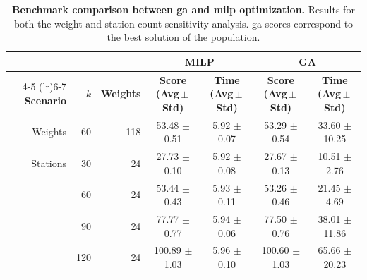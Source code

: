         \begin{table}[!htbp]
        \centering
        \caption[Benchmark comparison between GA and MILP optimization]{
            \textbf{Benchmark comparison between \ac{ga} and \ac{milp} optimization.} 
            Results for both the weight and station count sensitivity analysis. \ac{ga} scores correspond to the best solution of the population.}
        \label{table:MILP_combined}
        \footnotesize
        \begin{tabular}{r r r cc cc}
        \toprule
        & & & \multicolumn{2}{c}{\textbf{MILP}} & \multicolumn{2}{c}{\textbf{GA}} \\
        \cmidrule(lr){4-5} \cmidrule(lr){6-7}
        \textbf{Scenario} & \textbf{\(k\)} & \textbf{Weights} 
            & \textbf{Score (Avg\,$\pm$\,Std)} & \textbf{Time (Avg\,$\pm$\,Std)} 
            & \textbf{Score (Avg\,$\pm$\,Std)} & \textbf{Time (Avg\,$\pm$\,Std)} \\
        \midrule
        Weights & 60 & 118 & 53.48 $\pm$ 0.51 & 5.92 $\pm$ 0.07 & 53.29 $\pm$ 0.54 & 33.60 $\pm$ 10.25 \\
        \midrule
        Stations & 30 & 24  & 27.73 $\pm$ 0.10 & 5.92 $\pm$ 0.08 & 27.67 $\pm$ 0.13 & 10.51 $\pm$ 2.76 \\
                            & 60 & 24  & 53.44 $\pm$ 0.43 & 5.93 $\pm$ 0.11 & 53.26 $\pm$ 0.46 & 21.45 $\pm$ 4.69 \\
                            & 90 & 24  & 77.77 $\pm$ 0.77 & 5.94 $\pm$ 0.06 & 77.50 $\pm$ 0.76 & 38.01 $\pm$ 11.86 \\
                            & 120& 24  & 100.89 $\pm$ 1.03 & 5.96 $\pm$ 0.10 & 100.60 $\pm$ 1.03 & 65.66 $\pm$ 20.23 \\
        \bottomrule
        \end{tabular}
        \end{table}